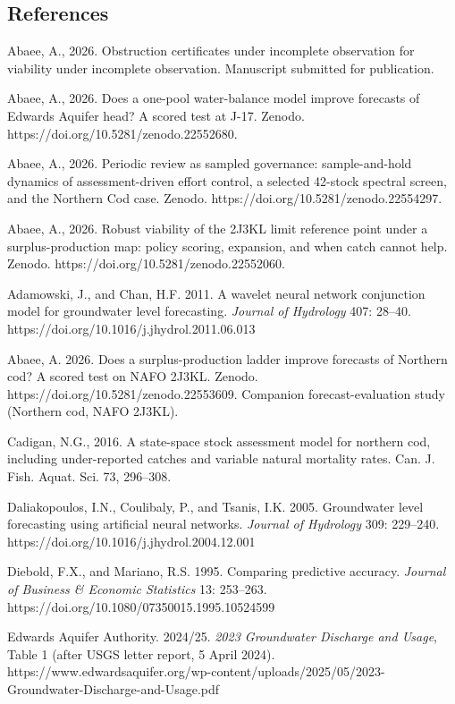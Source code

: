 \documentclass[11pt]{article}
\begin{document}
\subsection*{References}
\label{references}

Abaee, A., 2026. Obstruction certificates under incomplete observation for viability under incomplete
observation. Manuscript submitted for publication.

Abaee, A., 2026. Does a one-pool water-balance model improve forecasts
of Edwards Aquifer head? A scored test at J-17. Zenodo.
https://doi.org/10.5281/zenodo.22552680.

Abaee, A., 2026. Periodic review as sampled governance: sample-and-hold
dynamics of assessment-driven effort control, a selected 42-stock
spectral screen, and the Northern Cod case. Zenodo.
https://doi.org/10.5281/zenodo.22554297.

Abaee, A., 2026. Robust viability of the 2J3KL limit reference point
under a surplus-production map: policy scoring, expansion, and when
catch cannot help. Zenodo. https://doi.org/10.5281/zenodo.22552060.

Adamowski, J., and Chan, H.F. 2011. A wavelet neural network conjunction
model for groundwater level forecasting. \emph{Journal of Hydrology}
407: 28--40. https://doi.org/10.1016/j.jhydrol.2011.06.013

Abaee, A. 2026. Does a surplus-production ladder improve forecasts of
Northern cod? A scored test on NAFO 2J3KL. Zenodo.
https://doi.org/10.5281/zenodo.22553609. Companion forecast-evaluation
study (Northern cod, NAFO 2J3KL).

Cadigan, N.G., 2016. A state-space stock assessment model for northern
cod, including under-reported catches and variable natural mortality
rates. Can. J. Fish. Aquat. Sci. 73, 296--308.

Daliakopoulos, I.N., Coulibaly, P., and Tsanis, I.K. 2005. Groundwater
level forecasting using artificial neural networks. \emph{Journal of
Hydrology} 309: 229--240. https://doi.org/10.1016/j.jhydrol.2004.12.001

Diebold, F.X., and Mariano, R.S. 1995. Comparing predictive accuracy.
\emph{Journal of Business \& Economic Statistics} 13: 253--263.
https://doi.org/10.1080/07350015.1995.10524599

Edwards Aquifer Authority. 2024/25. \emph{2023 Groundwater Discharge and
Usage}, Table 1 (after USGS letter report, 5 April 2024).
https://www.edwardsaquifer.org/wp-content/uploads/2025/05/2023-Groundwater-Discharge-and-Usage.pdf
\end{document}

